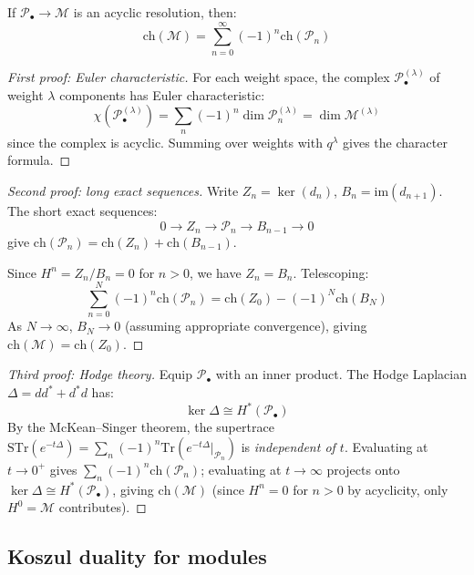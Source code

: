 \begin{theorem}\label{thm:character-acyclic-resolution}
If $\mathcal{P}_\bullet \to \mathcal{M}$ is an acyclic resolution, then:
\[
\text{ch}(\mathcal{M}) = \sum_{n=0}^\infty (-1)^n \text{ch}(\mathcal{P}_n)
\]
\end{theorem}

\begin{proof}[First proof: Euler characteristic]
For each weight space, the complex $\mathcal{P}_\bullet^{(\lambda)}$ of weight $\lambda$ components has Euler characteristic:
\[
\chi(\mathcal{P}_\bullet^{(\lambda)}) = \sum_n (-1)^n \dim \mathcal{P}_n^{(\lambda)} = \dim \mathcal{M}^{(\lambda)}
\]
since the complex is acyclic. Summing over weights with $q^{\lambda}$ gives the character formula.
\end{proof}

\begin{proof}[Second proof: long exact sequences]
Write $Z_n = \ker(d_n)$, $B_n = \text{im}(d_{n+1})$. The short exact sequences:
\[
0 \to Z_n \to \mathcal{P}_n \to B_{n-1} \to 0
\]
give $\text{ch}(\mathcal{P}_n) = \text{ch}(Z_n) + \text{ch}(B_{n-1})$.

Since $H^n = Z_n/B_n = 0$ for $n > 0$, we have $Z_n = B_n$. Telescoping:
\[
\sum_{n=0}^N (-1)^n \text{ch}(\mathcal{P}_n) = \text{ch}(Z_0) - (-1)^N \text{ch}(B_N)
\]
As $N \to \infty$, $B_N \to 0$ (assuming appropriate convergence), giving $\text{ch}(\mathcal{M}) = \text{ch}(Z_0)$.
\end{proof}

\begin{proof}[Third proof: Hodge theory]
Equip $\mathcal{P}_\bullet$ with an inner product. The Hodge Laplacian $\Delta = dd^* + d^*d$ has:
\[
\ker \Delta \cong H^*(\mathcal{P}_\bullet)
\]
By the McKean--Singer theorem, the supertrace $\mathrm{STr}(e^{-t\Delta}) = \sum_n (-1)^n \mathrm{Tr}(e^{-t\Delta}|_{\mathcal{P}_n})$ is \emph{independent of $t$}. Evaluating at $t \to 0^+$ gives $\sum_n (-1)^n \mathrm{ch}(\mathcal{P}_n)$; evaluating at $t \to \infty$ projects onto $\ker \Delta \cong H^*(\mathcal{P}_\bullet)$, giving $\mathrm{ch}(\mathcal{M})$ (since $H^n = 0$ for $n > 0$ by acyclicity, only $H^0 = \mathcal{M}$ contributes).
\end{proof}

\subsection{Koszul duality for modules}

